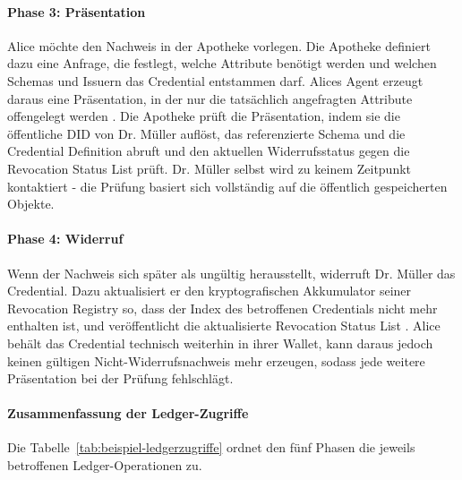 \paragraph{Phase 3: Präsentation}
Alice möchte den Nachweis in der Apotheke vorlegen. Die Apotheke definiert dazu eine Anfrage, die festlegt, welche Attribute benötigt werden und welchen Schemas und Issuern das Credential entstammen darf. Alices Agent erzeugt daraus eine Präsentation, in der nur die tatsächlich angefragten Attribute offengelegt werden \cite{anoncredsspec}. Die Apotheke prüft die Präsentation, indem sie die öffentliche DID von Dr. Müller auflöst, das referenzierte Schema und die Credential Definition abruft und den aktuellen Widerrufsstatus gegen die Revocation Status List prüft. Dr. Müller selbst wird zu keinem Zeitpunkt kontaktiert - die Prüfung basiert sich vollständig auf die öffentlich gespeicherten Objekte.

\paragraph{Phase 4: Widerruf}
Wenn der Nachweis sich später als ungültig herausstellt, widerruft Dr. Müller das Credential. Dazu aktualisiert er den kryptografischen Akkumulator seiner Revocation Registry so, dass der Index des betroffenen Credentials nicht mehr enthalten ist, und veröffentlicht die aktualisierte Revocation Status List \cite{anoncredsspec, torongo2023}. Alice behält das Credential technisch weiterhin in ihrer Wallet, kann daraus jedoch keinen gültigen Nicht-Widerrufsnachweis mehr erzeugen, sodass jede weitere Präsentation bei der Prüfung fehlschlägt.

\paragraph{Zusammenfassung der Ledger-Zugriffe}
Die Tabelle~\ref{tab:beispiel-ledgerzugriffe} ordnet den fünf Phasen die jeweils betroffenen Ledger-Operationen zu.

